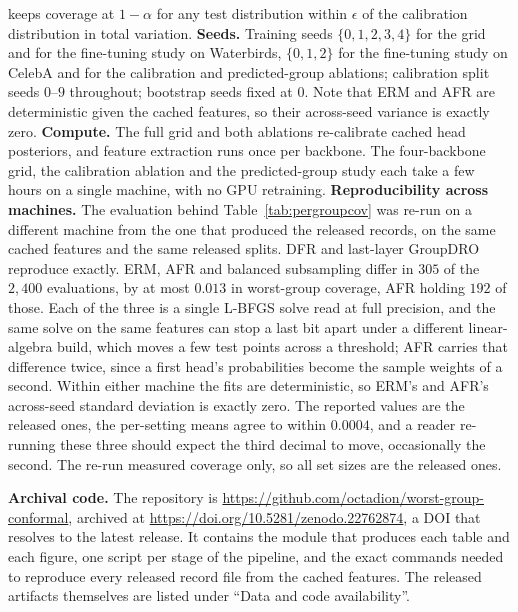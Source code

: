 \documentclass[pdflatex,sn-basic]{sn-jnl}%
\theoremstyle{thmstyleone}%
\begin{document}
\begin{appendices}
keeps coverage at $1-\alpha$ for any test distribution within $\epsilon$ of the calibration
distribution in total variation.
\textbf{Seeds.} Training seeds $\{0,1,2,3,4\}$ for the grid and for the fine-tuning study on
Waterbirds, $\{0,1,2\}$ for the fine-tuning study on CelebA and for the calibration and
predicted-group ablations; calibration split seeds
$0$--$9$ throughout; bootstrap seeds fixed at $0$. Note that ERM and AFR are
deterministic given the cached features, so their across-seed variance is exactly zero.
\textbf{Compute.} The full grid and both ablations re-calibrate cached head posteriors,
and feature extraction runs once per backbone. The four-backbone grid, the calibration ablation
and the predicted-group study each take a few hours on a single machine, with no GPU
retraining.
\textbf{Reproducibility across machines.} The evaluation behind Table~\ref{tab:pergroupcov} was
re-run on a different machine from the one that produced the released records, on the same cached
features and the same released splits. DFR and last-layer GroupDRO reproduce exactly. ERM, AFR and
balanced subsampling differ in $305$ of the $2{,}400$ evaluations, by at most $0.013$ in worst-group
coverage, AFR holding $192$ of those. Each of the three is a single L-BFGS solve read at full
precision, and the same solve on the same features can stop a last bit apart under a different
linear-algebra build, which moves a few test points across a threshold; AFR carries that difference
twice, since a first head's probabilities become the sample weights of a second. Within either
machine the fits are deterministic, so ERM's and AFR's across-seed standard deviation is exactly
zero. The reported values are the released ones, the per-setting means agree to within $0.0004$,
and a reader re-running these three should expect the third decimal to move, occasionally the
second. The re-run measured coverage only, so all set sizes are the released ones.

\textbf{Archival code.} The repository is
\url{https://github.com/octadion/worst-group-conformal}, archived at
\url{https://doi.org/10.5281/zenodo.22762874}, a DOI that resolves to the latest release. It
contains the module that produces each table and each figure, one script per stage of the
pipeline, and the exact commands needed to reproduce every released record file from the cached
features. The released artifacts themselves are
listed under ``Data and code availability''.

\end{appendices}


\end{document}
